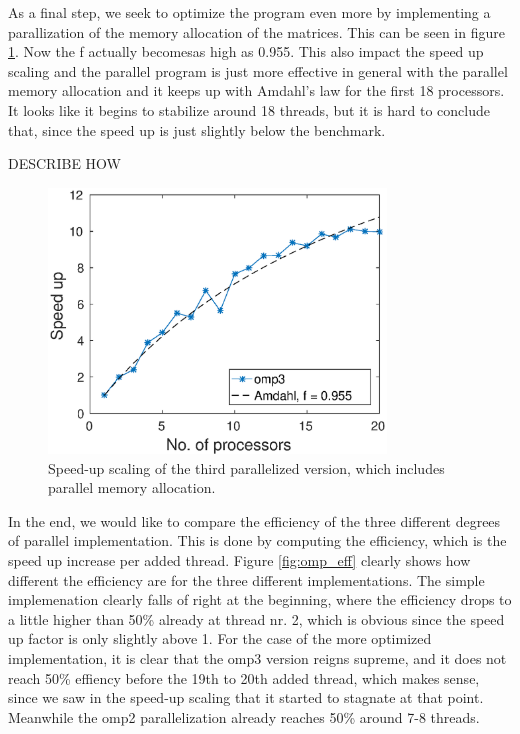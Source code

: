 As a final step, we seek to optimize the program even more by implementing a parallization of the memory allocation of the matrices. This can be seen in figure \ref{fig:omp3_scale}. Now the f actually becomesas high as 0.955. This also impact the speed up scaling and the parallel program is just more effective in general with the parallel memory allocation and it keeps up with Amdahl's law for the first 18 processors. It looks like it begins to stabilize around 18 threads, but it is hard to conclude that, since the speed up is just slightly below the benchmark.

\begin{huge}
DESCRIBE HOW
\end{huge}

\begin{figure}[h!]
\centering
\includegraphics[width = 0.8\textwidth]{fig/speedup_omp3.eps}
\caption{Speed-up scaling of the third parallelized version, which includes parallel memory allocation.}
\label{fig:omp3_scale}
\end{figure}


In the end, we would like to compare the efficiency of the three different degrees of parallel implementation. This is done by computing the efficiency, which is the speed up increase per added thread. Figure \ref{fig:omp_eff} clearly shows how different the efficiency are for the three different implementations. The simple implemenation clearly falls of right at the beginning, where the efficiency drops to a little higher than 50\% already at thread nr. 2, which is obvious since the speed up factor is only slightly above 1. For the case of the more optimized implementation, it is clear that the omp3 version reigns supreme, and it does not reach 50\% effiency before the 19th to 20th added thread, which makes sense, since we saw in the speed-up scaling that it started to stagnate at that point. Meanwhile the omp2 parallelization already reaches 50\% around 7-8 threads.

